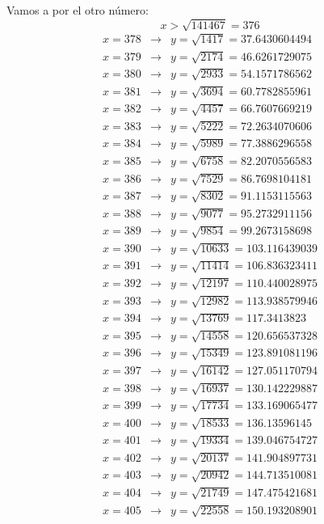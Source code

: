 \begin{problem}[4]
Vamos a por el otro número:
\[x>\sqrt{141467} = 376\]
\[\begin{array}{lcl}
x= 378  & \to &  y=\sqrt{ 1417 }= 37.6430604494 \\
x= 379  & \to &  y=\sqrt{ 2174 }= 46.6261729075 \\
x= 380  & \to &  y=\sqrt{ 2933 }= 54.1571786562 \\
x= 381  & \to &  y=\sqrt{ 3694 }= 60.7782855961 \\
x= 382  & \to &  y=\sqrt{ 4457 }= 66.7607669219 \\
x= 383  & \to &  y=\sqrt{ 5222 }= 72.2634070606 \\
x= 384  & \to &  y=\sqrt{ 5989 }= 77.3886296558 \\
x= 385  & \to &  y=\sqrt{ 6758 }= 82.2070556583 \\
x= 386  & \to &  y=\sqrt{ 7529 }= 86.7698104181 \\
x= 387  & \to &  y=\sqrt{ 8302 }= 91.1153115563 \\
x= 388  & \to &  y=\sqrt{ 9077 }= 95.2732911156 \\
x= 389  & \to &  y=\sqrt{ 9854 }= 99.2673158698 \\
x= 390  & \to &  y=\sqrt{ 10633 }= 103.116439039 \\
x= 391  & \to &  y=\sqrt{ 11414 }= 106.836323411 \\
x= 392  & \to &  y=\sqrt{ 12197 }= 110.440028975 \\
x= 393  & \to &  y=\sqrt{ 12982 }= 113.938579946 \\
x= 394  & \to &  y=\sqrt{ 13769 }= 117.3413823 \\
x= 395  & \to &  y=\sqrt{ 14558 }= 120.656537328 \\
x= 396  & \to &  y=\sqrt{ 15349 }= 123.891081196 \\
x= 397  & \to &  y=\sqrt{ 16142 }= 127.051170794 \\
x= 398  & \to &  y=\sqrt{ 16937 }= 130.142229887 \\
x= 399  & \to &  y=\sqrt{ 17734 }= 133.169065477 \\
x= 400  & \to &  y=\sqrt{ 18533 }= 136.13596145 \\
x= 401  & \to &  y=\sqrt{ 19334 }= 139.046754727 \\
x= 402  & \to &  y=\sqrt{ 20137 }= 141.904897731 \\
x= 403  & \to &  y=\sqrt{ 20942 }= 144.713510081 \\
x= 404  & \to &  y=\sqrt{ 21749 }= 147.475421681 \\
x= 405  & \to &  y=\sqrt{ 22558 }= 150.193208901 \\

\end{array}\]
\end{problem}
